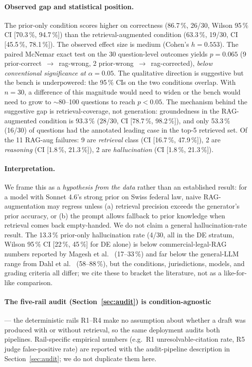 \documentclass[11pt,a4paper]{article}
\begin{document}
\paragraph{Observed gap and statistical position.} The prior-only condition scores higher on correctness (86.7\,\%, 26/30, Wilson 95\,\% CI [70.3\,\%, 94.7\,\%]) than the retrieval-augmented condition (63.3\,\%, 19/30, CI [45.5\,\%, 78.1\,\%]). The observed effect size is medium (Cohen's $h = 0.553$). The paired McNemar exact test on the 30 question-level outcomes yields $p = 0.065$ (9 prior-correct~$\to$~rag-wrong, 2 prior-wrong~$\to$~rag-corrected), \emph{below conventional significance at $\alpha=0.05$}. The qualitative direction is suggestive but the bench is underpowered: the 95\,\% CIs on the two conditions overlap. With $n=30$, a difference of this magnitude would need to widen or the bench would need to grow to $\sim$80--100 questions to reach $p<0.05$. The mechanism behind the suggestive gap is retrieval-coverage, not generation: groundedness in the RAG-augmented condition is 93.3\,\% (28/30, CI [78.7\,\%, 98.2\,\%]), and only 53.3\,\% (16/30) of questions had the annotated leading case in the top-5 retrieved set. Of the 11 RAG-aug failures: 9 are \emph{retrieval} class (CI [16.7\,\%, 47.9\,\%]), 2 are \emph{reasoning} (CI [1.8\,\%, 21.3\,\%]), 2 are \emph{hallucination} (CI [1.8\,\%, 21.3\,\%]).

\paragraph{Interpretation.} We frame this as a \emph{hypothesis from the data} rather than an established result: for a model with Sonnet 4.6's strong prior on Swiss federal law, naive RAG-augmentation may regress unless (a) retrieval precision exceeds the generator's prior accuracy, or (b) the prompt allows fallback to prior knowledge when retrieval comes back empty-handed. We do not claim a general hallucination-rate result. The 13.3\,\% prior-only hallucination rate (4/30, all in the DE stratum, Wilson 95\,\% CI [22\,\%, 45\,\%] for DE alone) is below commercial-legal-RAG numbers reported by Magesh et al.~\cite{magesh2024} (17--33\,\%) and far below the general-LLM range from Dahl et al.~\cite{dahl2024} (58--88\,\%), but the conditions, jurisdictions, models, and grading criteria all differ; we cite these to bracket the literature, not as a like-for-like comparison.

\paragraph{The five-rail audit (Section~\ref{sec:audit}) is condition-agnostic} --- the deterministic rails R1--R4 make no assumption about whether a draft was produced with or without retrieval, so the same deployment audits both pipelines. Rail-specific empirical numbers (e.g.\ R1 unresolvable-citation rate, R5 judge false-positive rate) are reported with the audit-pipeline description in Section~\ref{sec:audit}; we do not duplicate them here.
\end{document}
